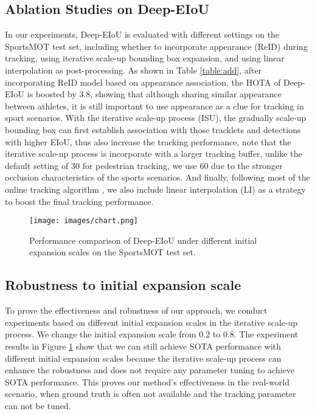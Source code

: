 \documentclass[10pt,twocolumn,letterpaper]{article}
\begin{document}
\subsection{Ablation Studies on Deep-EIoU}
In our experiments, Deep-EIoU is evaluated with different settings on the SportsMOT test set, including whether to incorporate appearance (ReID) during tracking, using iterative scale-up bounding box expansion, and using linear interpolation as post-processing.  As shown in Table \ref{table:add}, after incorporating ReID model based on appearance association, the HOTA of Deep-EIoU is boosted by 3.8, showing that although sharing similar appearance between athletes, it is still important to use appearance as a clue for tracking in sport scenarios. With the iterative scale-up process (ISU), the gradually scale-up bounding box can first establish association with those tracklets and detections with higher EIoU, thus also increase the tracking performance, note that the iterative scale-up process is incorporate with a larger tracking buffer, unlike the default setting of 30 for pedestrian tracking, we use 60 due to the stronger occlusion characteristics of the sports scenarios. And finally, following most of the online tracking algorithm \cite{ByteTrack,OCSORT}, we also include linear interpolation (LI) as a strategy to boost the final tracking performance.

\begin{figure}[h]
\texttt{[image: images/chart.png]}
\centering
\caption{Performance comparison of Deep-EIoU under different initial expansion scales on the SportsMOT test set.}
\label{fig:initial}
\end{figure}

\subsection{Robustness to initial expansion scale}
To prove the effectiveness and robustness of our approach, we conduct experiments based on different initial expansion scales in the iterative scale-up process. We change the initial expansion scale from 0.2 to 0.8. The experiment results in Figure \ref{fig:initial} show that we can still achieve SOTA performance with different initial expansion scales because the iterative scale-up process can enhance the robustness and does not require any parameter tuning to achieve SOTA performance. This proves our method's effectiveness in the real-world scenario, when ground truth is often not available and the tracking parameter can not be tuned.
\end{document}
